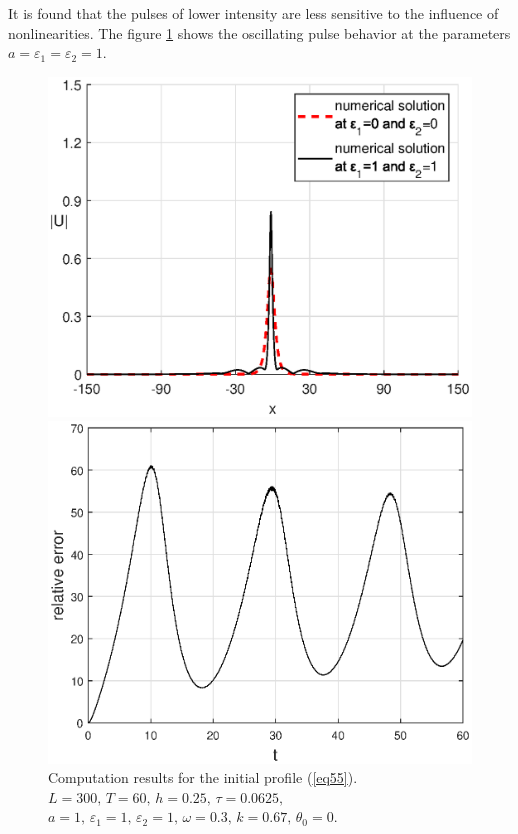 \documentclass[preprint,12pt]{elsarticle}
\begin{document}
It is found that the pulses of lower intensity are less sensitive to the influence of nonlinearities. The figure \ref{fig22} shows the oscillating pulse behavior at the parameters \(a=\varepsilon_{1}=\varepsilon_{2}=1\).
\begin{figure}[H]%
\begin{center}
\begin{minipage}[h]{0.48\linewidth}
\includegraphics[width=1\linewidth]{fig41.eps}
\end{minipage}
\hfill
\begin{minipage}[h]{0.48\linewidth}
\includegraphics[width=1\linewidth]{fig42.eps}
\end{minipage}
\end{center}
\caption{Computation results for the initial profile (\ref{eq55}).\\ 
\(L=300,\, T=60,\, h=0.25,\, \tau=0.0625,\)\\
\(a=1,\,\varepsilon_{1}=1,\,\varepsilon_{2}=1,\, \omega=0.3,\, k=0.67,\, \theta_{0}=0\).}
\label{fig22}
\end{figure}
\end{document}
